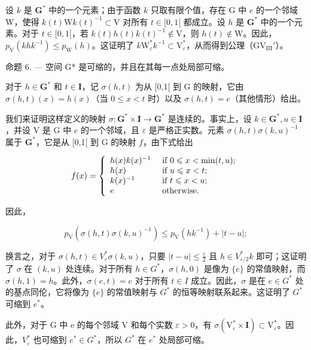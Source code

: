 设 \(k\) 是 \(\mathbf{G}^*\) 中的一个元素；由于函数 \(k\) 只取有限个值，存在 G 中 \(e\) 的一个邻域 W，使得 \(k(t)\mathrm{W}k(t)^{-1}\subset \mathrm{V}\) 对所有 \(t\in [0,1[\) 都成立。设 \(h\) 是 \(\mathbf{G}^*\) 中的一个元素。对于 \(t\in [0,1[\)，若 \(k(t)h(t)k(t)^{-1}\not\in\mathrm{V}\)，则 \(h(t)\not\in\mathrm{W}\)。因此，\(p_{\mathrm{V}}(khk^{-1})\leqslant p_{\mathrm{W}}(h)\)。这证明了 \(k\mathrm{W}_{\varepsilon}^{*}k^{-1}\subset\mathrm{V}_{\varepsilon}^{*}\)，从而得到公理（\(\mathrm{GV}_{\mathrm{III}}'\)）。

命题 6. --- 空间 G* 是可缩的，并且在其每一点处局部可缩。

对于 \(h \in \mathbf{G}^*\) 和 \(t \in \mathbf{I}\)，记 \(\sigma(h, t)\) 为从 [0,1[ 到 G 的映射，它由 \(\sigma(h, t)(x) = h(x)\)（当 \(0 \leqslant x < t\) 时）以及 \(\sigma(h, t) = e\)（其他情形）给出。

我们来证明这样定义的映射 \(\sigma\colon\mathbf{G}^{*}\times\mathbf{I}\to\mathbf{G}^{*}\) 是连续的。事实上，设 \(k\in\mathbf{G}^{*}, u\in\mathbf{I}\)，并设 V 是 G 中 \(e\) 的一个邻域，且 \(\varepsilon\) 是严格正实数。元素 \(\sigma(h,t)\sigma(k,u)^{-1}\) 属于 \(\mathbf{G}^{*}\)，它是从 [0,1[ 到 G 的映射 \(f\)，由下式给出

\[
f (x) = \left\{ \begin{array}{l l} h (x) k (x) ^ {- 1} & \text { if } 0 \leqslant x <   \min (t, u); \\ h (x) & \text { if } u \leqslant x <   t; \\ k (x) ^ {- 1} & \text { if } t \leqslant x <   u; \\ e & \text { otherwise. } \end{array} \right.
\]

因此，

\[
p _ {\mathrm{V}} (\sigma (h, t) \sigma (k, u) ^ {- 1}) \leqslant p _ {\mathrm{V}} (h k ^ {- 1}) + | t - u |;
\]

换言之，对于 \(\sigma(h,t) \in V_{\varepsilon}^{*}\sigma(k,u)\)，只要 \(|t-u| \leqslant \frac{\varepsilon}{2}\) 且 \(h \in V_{\varepsilon/2}^{*}k\) 即可；这证明了 \(\sigma\) 在 \((k,u)\) 处连续。对于所有 \(h \in G^{*}\)，\(\sigma(h,0)\) 是像为 \(\{e\}\) 的常值映射，而 \(\sigma(h,1)=h\)。此外，\(\sigma(e,t)=e\) 对于所有 \(t \in I\) 成立。因此，\(\sigma\) 是在 \(e \in G^{*}\) 处的基点同伦，它将像为 \(\{e\}\) 的常值映射与 \(G^{*}\) 的恒等映射联系起来。这证明了 \(G^{*}\) 可缩到 \(e^{*}\)。

此外，对于 G 中 e 的每个邻域 V 和每个实数 \(\varepsilon > 0\)，有 \(\sigma(\mathrm{V}_{\varepsilon}^{*} \times \mathbf{I}) \subset \mathrm{V}_{\varepsilon}^{*}\)。因此，\(V_{\varepsilon}^{*}\) 也可缩到 \(e^{*} \in G^{*}\)，所以 \(G^{*}\) 在 \(e^{*}\) 处局部可缩。

